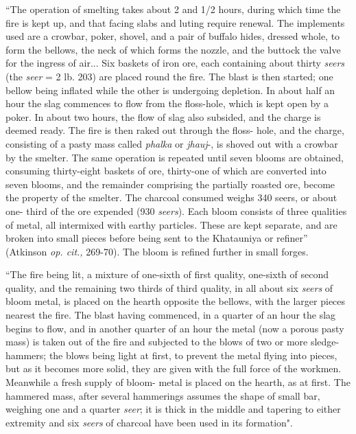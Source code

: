 \footnotesize{“The operation of smelting takes about 2 and 1/2 hours, during which time the fire is kept up, and that facing slabs and luting require renewal. The implements used are a crowbar, poker, shovel, and a pair of buffalo hides, dressed whole, to form the bellows, the neck of which forms the nozzle, and the buttock the valve for the ingress of air... Six baskets of iron ore, each containing about thirty {\it seers} (the {\it seer}	= 2 lb. 203) are placed round the fire. The blast is then started; one bellow being inflated while the other is undergoing depletion. In about half an hour the slag commences to flow from the floss-hole, which is kept open by a poker. In about two hours, the flow of slag also subsided, and the charge is deemed ready. The fire is then raked out through the floss- hole, and the charge, consisting of a pasty mass called {\it phalka} or {\it jhauj}-, is shoved out with a crowbar by the smelter. The same operation is repeated until seven blooms are obtained, consuming thirty-eight baskets of ore, thirty-one of which are converted into seven blooms, and the remainder comprising the partially roasted ore, become the property of the smelter. The charcoal consumed weighs 340 seers, or about one- third of the ore expended (930 {\it seers}). Each bloom consists of three qualities of metal, all intermixed with earthy particles. These are kept separate, and are broken into small pieces before being sent to the Khatauniya or refiner”} (Atkinson {\it op. cit.,} 269-70). The bloom is refined further in small forges.


\footnotesize{``The fire being lit, a mixture of one-sixth of first quality, one-sixth of second quality, and the remaining two ­thirds of third quality, in all about six {\it seers} of bloom metal, is placed on the hearth opposite the bellows, with the larger pieces nearest the fire. The blast having commenced, in a quarter of an hour the slag begins to flow, and in another quarter of an hour the metal (now a porous pasty mass) is taken out of the fire and subjected to the blows of two or more sledge-hammers; the blows being light at first, to prevent the metal flying into pieces, but as it becomes more solid, they are given with the full force of the workmen. Meanwhile a fresh supply of bloom­- metal is placed on the hearth, as at first. The hammered mass, after several hammerings assumes the shape of small bar, weighing one and a quarter {\it seer}; it is thick in the middle and tapering to either extremity and six {\it seers} of charcoal have been used in its formation".} 

